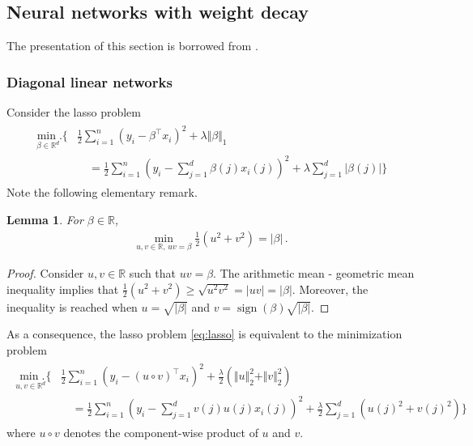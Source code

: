 \documentclass[11pt,reqno]{article}
\DeclareMathOperator{\sign}{sign}
\newcommand{\R}{\mathbb{R}}
\renewcommand{\geq}{\geqslant}
\numberwithin{equation}{section}
\theoremstyle{plain}
\newtheorem{lem}[assumption]{Lemma}
\theoremstyle{definition}
\theoremstyle{remark}
\begin{document}
\subsection{Neural networks with weight decay}

The presentation of this section is borrowed from \cite{tibshirani2021equivalences}.

\subsubsection{Diagonal linear networks}
\label{sec:equivalences-dln}

Consider the lasso problem 
\begin{align}
	\label{eq:lasso}
	\begin{split}
	\underset{\beta \in \R^d}{\min.} \Bigg\{&\frac{1}{2} \sum_{i=1}^{n} \left(y_i - \beta^\top x_i \right)^2 + \lambda \Vert \beta \Vert_1 \\
	&\quad= \frac{1}{2} \sum_{i=1}^{n} \left(y_i - \sum_{j=1}^{d}\beta(j) x_i(j) \right)^2 + \lambda \sum_{j=1}^{d} \vert \beta(j) \vert \Bigg\}
	\end{split}
\end{align}
Note the following elementary remark.
\begin{lem}
	\label{lem:dln}
	For $\beta \in \R$, \begin{align*}
		\min_{u,v\in \R, \, uv = \beta} \frac{1}{2}(u^2 + v^2) = \vert \beta \vert \, .
	\end{align*} 
\end{lem}
\begin{proof}
	Consider $u,v\in \R$ such that $uv = \beta$. The arithmetic mean - geometric mean inequality implies that $\frac{1}{2}(u^2 + v^2) \geq \sqrt{u^2v^2} = \vert uv \vert = \vert \beta \vert$. Moreover, the inequality is reached when $u = \sqrt{\vert \beta \vert}$ and $v = \sign(\beta)\sqrt{\vert \beta \vert}$.
\end{proof}
As a consequence, the lasso problem \eqref{eq:lasso} is equivalent to the minimization problem
\begin{align}
	\label{eq:dln}
	\begin{split}
	\underset{u,v \in \R^d}{\min.} \Bigg\{&\frac{1}{2} \sum_{i=1}^{n} \left(y_i - (u \circ v)^\top x_i \right)^2 + \frac{\lambda}{2} \left(\Vert u \Vert_2^2 + \Vert v \Vert_2^2\right) \\
	&\quad= \frac{1}{2} \sum_{i=1}^{n} \left(y_i - \sum_{j=1}^{d}v(j)u(j) x_i(j) \right)^2 +\frac{\lambda}{2} \sum_{j=1}^{d} \left(u(j)^2 + v(j)^2\right) \Bigg\}
	\end{split}
\end{align}
where $u \circ v$ denotes the component-wise product of $u$ and $v$. 
\end{document}
